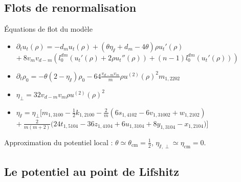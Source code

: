 \documentclass[xcolor=dvipsnames]{beamer}
\begin{document}
\subsection{Flots de renormalisation}
\begin{frame}

\begin{block}{Équations de flot du modèle}
\begin{itemize}
\item $\partial_t u_t(\rho) = -d_m u_t(\rho) + (\theta \eta_\sslash + d_m - 4 \theta) \rho u_t'(\rho)$ \\
\hfill $+~8 v_m v_{d-m} \left( l_0^{dm}\left(u_t'(\rho) + 2 \rho u_t''(\rho) \right) + (n-1)l_0^{dm}\left(u_t'(\rho)\right) \right)$

\item $\partial_t \rho_0 = -\theta \left(2-\eta_\sslash\right) \rho_0 - 64 \frac{ v_{d-m} v_m}{m} \rho u^{(2)}(\rho)^2 m_{1,2202} $

\item $\eta_\perp = 32 v_{d-m} v_m \rho u^{(2)}(\rho)^2$

\item $\eta_\sslash = \eta_\perp  \Big[ m_{1,3100} - \frac{1}{2} k_{1,2100}-\frac{2}{m}\left( 6 s_{1,4102}-6 v_{1,31002}+ w_{1,2102} \right)$ \\
\hfill$+~\frac{2}{m(m+2)}\big( 24 t_{1,5104} -36 z_{1,4104}+6 u_{1,3104} +8 y_{1,3104} - x_{1,2104} \big) \Big]$
\end{itemize}
\end{block}

Approximation du potentiel local : $\theta \simeq \theta_{\text{cm}} = \frac{1}{2}$, $\eta_{\sslash, \perp} \simeq \eta_{\text{cm}} = 0$.
\end{frame}

\subsection{Le potentiel au point de Lifshitz}
\end{document}
